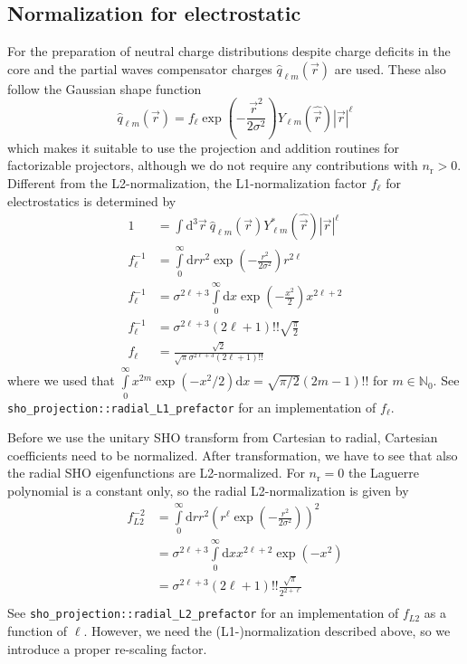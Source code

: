 \documentclass[oribibl]{llncs}
\newcommand{\ttt}[1]{\texttt{#1}}
\newcommand{\nrn}{n_{\mathrm{r}}}
\begin{document}
\subsection{Normalization for electrostatic}
For the preparation of neutral charge distributions despite charge deficits in the core and the partial waves
compensator charges $\hat q_{\ell m}(\vec r)$ are used.
These also follow the Gaussian shape function %
\begin{equation}
 \hat q_{\ell m}(\vec r) = f_{\ell} \exp(-\frac{\vec r^2} {2\sigma^2}) Y_{\ell m}(\hat{\vec r}) |\vec r|^\ell
\end{equation}
which makes it suitable to use the projection and addition routines for factorizable projectors,
although we do not require any contributions with $\nrn > 0$.
Different from the L2-normalization, the L1-normalization factor $f_\ell$ for electrostatics is determined by
\begin{align}
 1 &= \int \mathrm d^3\vec r  \  \hat q_{\ell m}(\vec r) Y^*_{\ell m}(\hat{\vec r}) |\vec r|^\ell \\
 f_\ell^{-1} &= \int\limits_0^\infty \mathrm d r r^2 \exp(-\frac{r^2} {2\sigma^2}) r^{2\ell} \\
 f_\ell^{-1} &= \sigma^{2\ell + 3} \int\limits_0^\infty \mathrm d x \exp(-\frac{x^2}{2}) x^{2\ell + 2} \\
 f_\ell^{-1} &= \sigma^{2\ell + 3} (2\ell + 1)!! \sqrt{\frac{\pi}{2}} \\
 f_\ell &= \frac{\sqrt{2}}{\sqrt{\pi} \sigma^{2\ell + 3} (2\ell + 1)!!}
\end{align}
where we used that $\int\limits_0^{\infty} x^{2m} \exp(-x^2/2) \mathrm dx  = \sqrt{\pi/2} (2m-1)!!$ for $m \in \mathbb N_0$.
See \ttt{sho\_projection::radial\_L1\_prefactor} for an implementation of $f_\ell$.

Before we use the unitary SHO transform from Cartesian to radial,
Cartesian coefficients need to be normalized.
After transformation, we have to see that also the radial SHO eigenfunctions are L2-normalized.
For $\nrn = 0$ the Laguerre polynomial is a constant only, so
the radial L2-normalization is given by
\begin{align}
	f^{-2}_{L2} &= \int\limits_0^\infty \mathrm dr r^2 \left( r^\ell \exp(-\frac{r^2}{2\sigma^2}) \right)^2 \\
				&= \sigma^{2\ell + 3} \int\limits_0^\infty \mathrm dx x^{2\ell + 2} \exp(-x^2) \\
				&= \sigma^{2\ell + 3} (2\ell + 1)!! \frac{\sqrt{\pi}}{2^{2+\ell}} \\
\end{align}
See \ttt{sho\_projection::radial\_L2\_prefactor} for an implementation of $f_{L2}$ as a function of $\ell$.
However, we need the (L1-)normalization described above, so we introduce a proper re-scaling factor.




 
\end{document}

